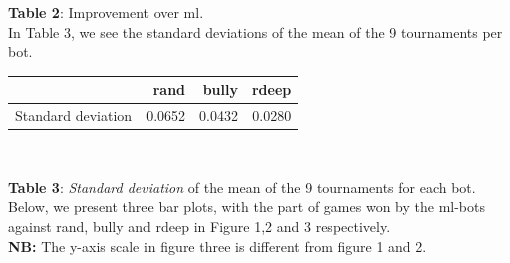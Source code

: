 \documentclass[a4paper,11pt]{article}
\begin{document}
\textbf{Table 2}: Improvement over ml. \\

In Table 3, we see the standard deviations of the mean of the 9 tournaments per bot.

\begin{center}
\begin{tabular}{| r | r | r | r |}
\hline
      & \textbf{rand} & \textbf{bully} & \textbf{rdeep}\\ \hline
      Standard deviation & 0.0652 & 0.0432 & 0.0280    \\ \hline
\end{tabular} \\
\end{center}

\textbf{Table 3}: \textit{Standard deviation} of the mean of the 9 tournaments for each bot. \\

Below, we present three bar plots, with the part of games won by the ml-bots against rand, bully and rdeep in Figure 1,2 and 3 respectively. \\
\textbf{NB:} The y-axis scale in figure three is different from figure 1 and 2.
\end{document}
